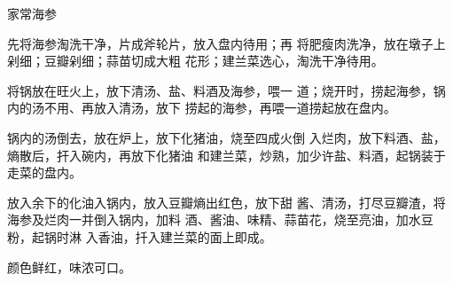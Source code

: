 \begin{recipe}{家常海参}

\ingredients



\cooking

\step 	先将海参淘洗干净，片成斧轮片，放入盘内待用；再 将肥瘦肉洗净，放在墩子上剁细；豆瓣剁细；蒜苗切成大粗 花形；建兰菜选心，淘洗干净待用。

\step 	将锅放在旺火上，放下清汤、盐、料酒及海参，喂一 道；烧开时，捞起海参，锅内的汤不用、再放入清汤，放下 捞起的海参，再喂一道捞起放在盘内。

\step 	锅内的汤倒去，放在炉上，放下化猪油，烧至四成火倒 入烂肉，放下料酒、盐，熵散后，扞入碗内，再放下化猪油 和建兰菜，炒熟，加少许盐、料酒，起锅装于走菜的盘内。

放入余下的化油入锅内，放入豆瓣熵出红色，放下甜 酱、清汤，打尽豆瓣渣，将海参及烂肉一并倒入锅内，加料 酒、酱油、味精、蒜苗花，烧至亮油，加水豆粉，起锅时淋 入香油，扦入建兰菜的面上即成。

\notes

颜色鲜红，味浓可口。

\end{recipe}

